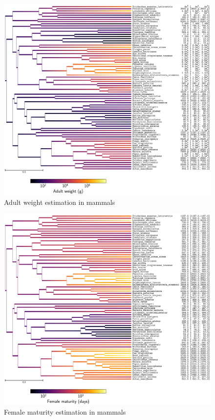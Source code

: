 \documentclass{article}
\begin{document}
	\begin{figure}[H]
		\centering
		\includegraphics[width=\linewidth, page=1]{mammals/18CDS_SiteMutSelBranchNe_R1_LogAdult_weight}
		\caption[Adult weight estimation in mammals]{Adult weight estimation in mammals}
	\end{figure}

	\begin{figure}[H]
		\centering
		\includegraphics[width=\linewidth, page=1]{mammals/18CDS_SiteMutSelBranchNe_R1_LogFemale_maturity}
		\caption[Female maturity estimation in mammals]{Female maturity estimation in mammals}
	\end{figure}
\end{document}
